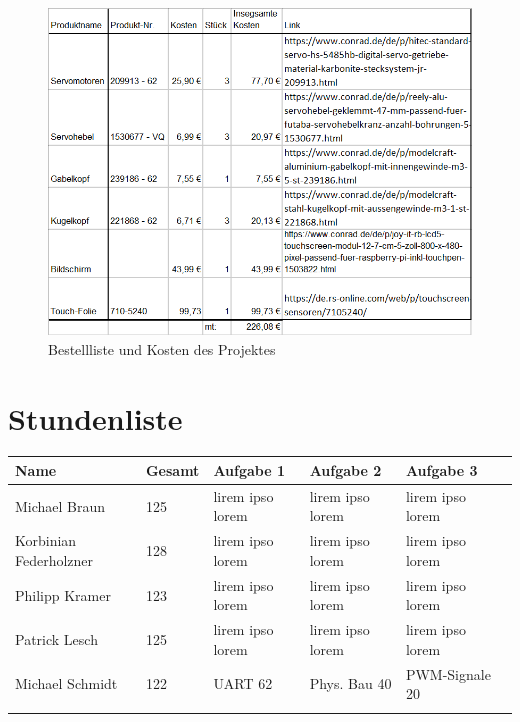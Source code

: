 \documentclass[12pt,a4paper,bibliography=totoc,listof=totoc]{scrartcl}
\begin{document}
\begin{figure}[htbp]
	\centering
	\includegraphics[scale = 0.8]{pics/Bestelliste}
	\caption{Bestellliste und Kosten des Projektes}
	\label{fig:bestell}
\end{figure}

\section {Stundenliste}

\begin{tabularx}{\textwidth}{p{}|l|l|l|l|l|}
\hline
 Name					& Gesamt &Aufgabe 1	&Aufgabe 2	&Aufgabe 3 \\
 \hline
 Michael Braun			&125			&lirem ipso lorem			&lirem ipso lorem			&lirem ipso lorem			\\
 \hline
 Korbinian Federholzner	&128			&lirem ipso lorem			&lirem ipso lorem			&lirem ipso lorem			\\
 \hline
 Philipp Kramer			&123			&lirem ipso lorem			&lirem ipso lorem			&lirem ipso lorem			\\
 \hline
 Patrick Lesch			&125			&lirem ipso lorem			&lirem ipso lorem			&lirem ipso lorem			\\
 \hline
 Michael Schmidt		&122			&UART 62			& Phys. Bau 40			&PWM-Signale 20			\\
  \hline
\label{tbl:stundenliste}
\end{tabularx}
\end{document}
